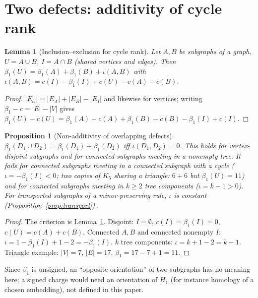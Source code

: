 \documentclass[10pt]{article}
\theoremstyle{definition}
\theoremstyle{plain}
\newtheorem{proposition}[theorem]{Proposition}
\newtheorem{lemma}[theorem]{Lemma}
\theoremstyle{remark}
\newcommand{\Betti}{\beta_1}
\begin{document}
\section{Two defects: additivity of cycle rank}\label{sec:two}
\begin{lemma}[Inclusion--exclusion for cycle rank]\label{lem:mv}
Let $A,B$ be subgraphs of a graph, $U=A\cup B$, $I=A\cap B$ (shared vertices and edges). Then $\Betti(U)=\Betti(A)+\Betti(B)+\iota(A,B)$ with $\iota(A,B)=c(I)-\Betti(I)+c(U)-c(A)-c(B)$.
\end{lemma}
\begin{proof}
$|E_U|=|E_A|+|E_B|-|E_I|$ and likewise for vertices; writing $\Betti-c=|E|-|V|$ gives $\Betti(U)-c(U)=\Betti(A)-c(A)+\Betti(B)-c(B)-\Betti(I)+c(I)$.
\end{proof}
\begin{proposition}[Non-additivity of overlapping defects]\label{prop:add}
$\Betti(D_1\cup D_2)=\Betti(D_1)+\Betti(D_2)$ iff $\iota(D_1,D_2)=0$. This holds for vertex-disjoint subgraphs and for connected subgraphs meeting in a nonempty tree. It fails for connected subgraphs meeting in a connected subgraph with a cycle ($\iota=-\Betti(I)<0$; two copies of $K_5$ sharing a triangle: $6+6$ but $\Betti(U)=11$) and for connected subgraphs meeting in $k\ge2$ tree components ($\iota=k-1>0$). For transported subgraphs of a minor-preserving rule, $\iota$ is constant (Proposition~\ref{prop:transport}).
\end{proposition}
\begin{proof}
The criterion is Lemma~\ref{lem:mv}. Disjoint: $I=\emptyset$, $c(I)=\Betti(I)=0$, $c(U)=c(A)+c(B)$. Connected $A,B$ and connected nonempty $I$: $\iota=1-\Betti(I)+1-2=-\Betti(I)$. $k$ tree components: $\iota=k+1-2=k-1$. Triangle example: $|V|=7$, $|E|=17$, $\Betti=17-7+1=11$.
\end{proof}
\noindent Since $\Betti$ is unsigned, an ``opposite orientation'' of two subgraphs has no meaning here; a signed charge would need an orientation of $H_1$ (for instance homology of a chosen embedding), not defined in this paper.

\end{document}
